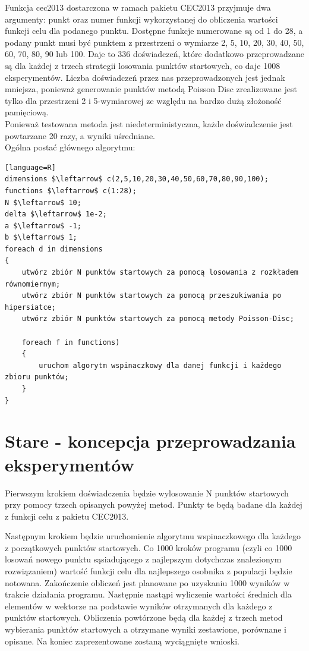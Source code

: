 \documentclass{article}
\begin{document}
Funkcja cec2013 dostarczona w ramach pakietu CEC2013 przyjmuje dwa argumenty: punkt oraz numer funkcji wykorzystanej do obliczenia wartości funkcji celu dla podanego punktu. Dostępne funkcje numerowane są od 1 do 28, a podany punkt musi być punktem z przestrzeni o wymiarze 2, 5, 10, 20, 30, 40, 50, 60, 70, 80, 90 lub 100. Daje to 336 doświadczeń, które dodatkowo przeprowadzane są dla każdej z trzech strategii losowania punktów startowych, co daje 1008 eksperymentów. Liczba doświadczeń przez nas przeprowadzonych jest jednak mniejsza, ponieważ generowanie punktów metodą Poisson Disc zrealizowane jest tylko dla przestrzeni 2 i 5-wymiarowej ze względu na bardzo dużą złożoność pamięciową.\\
Ponieważ testowana metoda jest niedeterministyczna, każde doświadczenie jest powtarzane 20 razy, a wyniki uśredniane.\\
Ogólna postać głównego algorytmu:
\begin{lstlisting}[mathescape][language=R]
dimensions $\leftarrow$ c(2,5,10,20,30,40,50,60,70,80,90,100);
functions $\leftarrow$ c(1:28);
N $\leftarrow$ 10; 
delta $\leftarrow$ 1e-2;
a $\leftarrow$ -1;
b $\leftarrow$ 1;
foreach d in dimensions
{
    utwórz zbiór N punktów startowych za pomocą losowania z rozkładem równomiernym;
    utwórz zbiór N punktów startowych za pomocą przeszukiwania po hipersiatce;
    utwórz zbiór N punktów startowych za pomocą metody Poisson-Disc;

    foreach f in functions)
    {
        uruchom algorytm wspinaczkowy dla danej funkcji i każdego zbioru punktów;
    }
}
\end{lstlisting}



\section{Stare - koncepcja przeprowadzania eksperymentów}
Pierwszym krokiem doświadczenia będzie wylosowanie N punktów startowych przy pomocy trzech opisanych powyżej metod. Punkty te będą badane dla każdej z funkcji celu z pakietu CEC2013.

Następnym krokiem będzie uruchomienie algorytmu wspinaczkowego dla każdego z początkowych punktów startowych. Co 1000 kroków programu (czyli co 1000 losowań nowego punktu sąsiadującego z najlepszym dotychczas znalezionym rozwiązaniem) wartość funkcji celu dla najlepszego osobnika z populacji będzie notowana. Zakończenie obliczeń jest planowane po uzyskaniu 1000 wyników w trakcie działania programu. Następnie nastąpi wyliczenie wartości średnich dla elementów w wektorze na podstawie wyników otrzymanych dla każdego z punktów startowych. Obliczenia powtórzone będą dla każdej z trzech metod wybierania punktów startowych a otrzymane wyniki zestawione, porównane i opisane. Na koniec zaprezentowane zostaną wyciągnięte wnioski.
\end{document}
